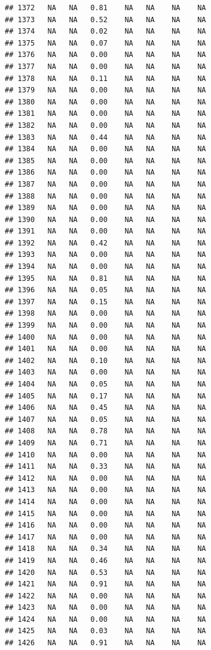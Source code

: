 \documentclass{article}\usepackage{graphicx, color}
\makeatletter
\newenvironment{kframe}{%
 \def\at@end@of@kframe{}%
 \ifinner\ifhmode%
  \def\at@end@of@kframe{\end{minipage}}%
  \begin{minipage}{\columnwidth}%
 \fi\fi%
 \def\FrameCommand##1{\hskip\@totalleftmargin \hskip-\fboxsep
 \colorbox{shadecolor}{##1}\hskip-\fboxsep
     \hskip-\linewidth \hskip-\@totalleftmargin \hskip\columnwidth}%
 \MakeFramed {\advance\hsize-\width
   \@totalleftmargin\z@ \linewidth\hsize
   \@setminipage}}%
 {\par\unskip\endMakeFramed%
 \at@end@of@kframe}
\newenvironment{knitrout}{}{} %
\makeatother
\begin{document}
\begin{knitrout}
\begin{kframe}
\begin{verbatim}
## 1372   NA   NA   0.81    NA   NA    NA    NA
## 1373   NA   NA   0.52    NA   NA    NA    NA
## 1374   NA   NA   0.02    NA   NA    NA    NA
## 1375   NA   NA   0.07    NA   NA    NA    NA
## 1376   NA   NA   0.00    NA   NA    NA    NA
## 1377   NA   NA   0.00    NA   NA    NA    NA
## 1378   NA   NA   0.11    NA   NA    NA    NA
## 1379   NA   NA   0.00    NA   NA    NA    NA
## 1380   NA   NA   0.00    NA   NA    NA    NA
## 1381   NA   NA   0.00    NA   NA    NA    NA
## 1382   NA   NA   0.00    NA   NA    NA    NA
## 1383   NA   NA   0.44    NA   NA    NA    NA
## 1384   NA   NA   0.00    NA   NA    NA    NA
## 1385   NA   NA   0.00    NA   NA    NA    NA
## 1386   NA   NA   0.00    NA   NA    NA    NA
## 1387   NA   NA   0.00    NA   NA    NA    NA
## 1388   NA   NA   0.00    NA   NA    NA    NA
## 1389   NA   NA   0.00    NA   NA    NA    NA
## 1390   NA   NA   0.00    NA   NA    NA    NA
## 1391   NA   NA   0.00    NA   NA    NA    NA
## 1392   NA   NA   0.42    NA   NA    NA    NA
## 1393   NA   NA   0.00    NA   NA    NA    NA
## 1394   NA   NA   0.00    NA   NA    NA    NA
## 1395   NA   NA   0.81    NA   NA    NA    NA
## 1396   NA   NA   0.05    NA   NA    NA    NA
## 1397   NA   NA   0.15    NA   NA    NA    NA
## 1398   NA   NA   0.00    NA   NA    NA    NA
## 1399   NA   NA   0.00    NA   NA    NA    NA
## 1400   NA   NA   0.00    NA   NA    NA    NA
## 1401   NA   NA   0.00    NA   NA    NA    NA
## 1402   NA   NA   0.10    NA   NA    NA    NA
## 1403   NA   NA   0.00    NA   NA    NA    NA
## 1404   NA   NA   0.05    NA   NA    NA    NA
## 1405   NA   NA   0.17    NA   NA    NA    NA
## 1406   NA   NA   0.45    NA   NA    NA    NA
## 1407   NA   NA   0.05    NA   NA    NA    NA
## 1408   NA   NA   0.78    NA   NA    NA    NA
## 1409   NA   NA   0.71    NA   NA    NA    NA
## 1410   NA   NA   0.00    NA   NA    NA    NA
## 1411   NA   NA   0.33    NA   NA    NA    NA
## 1412   NA   NA   0.00    NA   NA    NA    NA
## 1413   NA   NA   0.00    NA   NA    NA    NA
## 1414   NA   NA   0.00    NA   NA    NA    NA
## 1415   NA   NA   0.00    NA   NA    NA    NA
## 1416   NA   NA   0.00    NA   NA    NA    NA
## 1417   NA   NA   0.00    NA   NA    NA    NA
## 1418   NA   NA   0.34    NA   NA    NA    NA
## 1419   NA   NA   0.46    NA   NA    NA    NA
## 1420   NA   NA   0.53    NA   NA    NA    NA
## 1421   NA   NA   0.91    NA   NA    NA    NA
## 1422   NA   NA   0.00    NA   NA    NA    NA
## 1423   NA   NA   0.00    NA   NA    NA    NA
## 1424   NA   NA   0.00    NA   NA    NA    NA
## 1425   NA   NA   0.03    NA   NA    NA    NA
## 1426   NA   NA   0.91    NA   NA    NA    NA

\end{verbatim}
\end{kframe}
\end{knitrout}
\end{document}
